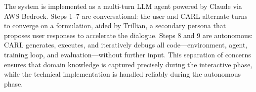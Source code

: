 The system is implemented as a multi-turn LLM agent powered by Claude via
AWS Bedrock. Steps 1--7 are conversational: the user and CARL alternate
turns to converge on a formulation, aided by Trillian, a secondary
persona that proposes user responses to accelerate the dialogue. Steps 8
and 9 are autonomous: CARL generates, executes, and iteratively debugs
all code---environment, agent, training loop, and evaluation---without
further input. This separation of concerns ensures that domain knowledge
is captured precisely during the interactive phase, while the technical
implementation is handled reliably during the autonomous phase.
